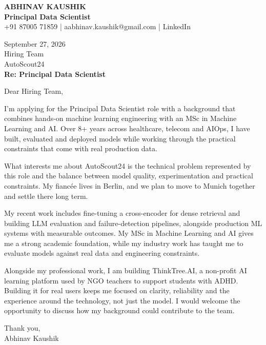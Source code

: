\documentclass[10pt,a4paper]{article}
\begin{document}
\begin{center}
{\Large\bfseries ABHINAV KAUSHIK}\\[2pt]
{\bfseries Principal Data Scientist}\\[2pt]
+91 87005 71859 \quad | \quad aabhinav.kaushik@gmail.com \quad | \quad LinkedIn
\end{center}
\vspace{8pt}
September 27, 2026\\[6pt]
Hiring Team\\
AutoScout24\\[4pt]
\textbf{Re: Principal Data Scientist}

Dear Hiring Team,

I’m applying for the Principal Data Scientist role with a background that combines hands-on machine learning engineering with an MSc in Machine Learning and AI. Over 8+ years across healthcare, telecom and AIOps, I have built, evaluated and deployed models while working through the practical constraints that come with real production data.

What interests me about AutoScout24 is the technical problem represented by this role and the balance between model quality, experimentation and practical constraints. My fiancée lives in Berlin, and we plan to move to Munich together and settle there long term.

My recent work includes fine-tuning a cross-encoder for dense retrieval and building LLM evaluation and failure-detection pipelines, alongside production ML systems with measurable outcomes. My MSc in Machine Learning and AI gives me a strong academic foundation, while my industry work has taught me to evaluate models against real data and engineering constraints.

Alongside my professional work, I am building ThinkTree.AI, a non-profit AI learning platform used by NGO teachers to support students with ADHD. Building it for real users keeps me focused on clarity, reliability and the experience around the technology, not just the model. I would welcome the opportunity to discuss how my background could contribute to the team.

Thank you,\\
Abhinav Kaushik
\end{document}
